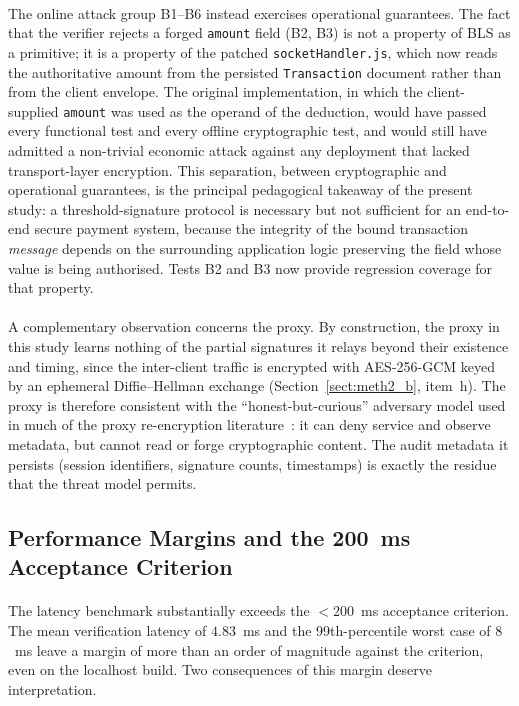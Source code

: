 \paragraph{}The online attack group B1--B6 instead exercises operational guarantees. The fact that the verifier rejects a forged \texttt{amount} field (B2, B3) is not a property of BLS as a primitive; it is a property of the patched \texttt{socketHandler.js}, which now reads the authoritative amount from the persisted \texttt{Transaction} document rather than from the client envelope. The original implementation, in which the client-supplied \texttt{amount} was used as the operand of the deduction, would have passed every functional test and every offline cryptographic test, and would still have admitted a non-trivial economic attack against any deployment that lacked transport-layer encryption. This separation, between cryptographic and operational guarantees, is the principal pedagogical takeaway of the present study: a threshold-signature protocol is necessary but not sufficient for an end-to-end secure payment system, because the integrity of the bound transaction \textit{message} depends on the surrounding application logic preserving the field whose value is being authorised. Tests B2 and B3 now provide regression coverage for that property.

\paragraph{}A complementary observation concerns the proxy. By construction, the proxy in this study learns nothing of the partial signatures it relays beyond their existence and timing, since the inter-client traffic is encrypted with AES-256-GCM keyed by an ephemeral Diffie--Hellman exchange (Section~\ref{sect:meth2_b}, item~h). The proxy is therefore consistent with the ``honest-but-curious'' adversary model used in much of the proxy re-encryption literature~\cite{chen2011, ruffing2014}: it can deny service and observe metadata, but cannot read or forge cryptographic content. The audit metadata it persists (session identifiers, signature counts, timestamps) is exactly the residue that the threat model permits.

\subsection{Performance Margins and the 200~ms Acceptance Criterion}
\label{sect:disc_perf}

\paragraph{}The latency benchmark substantially exceeds the $< 200$~ms acceptance criterion. The mean verification latency of $4.83$~ms and the 99th-percentile worst case of $8$~ms leave a margin of more than an order of magnitude against the criterion, even on the localhost build. Two consequences of this margin deserve interpretation.

